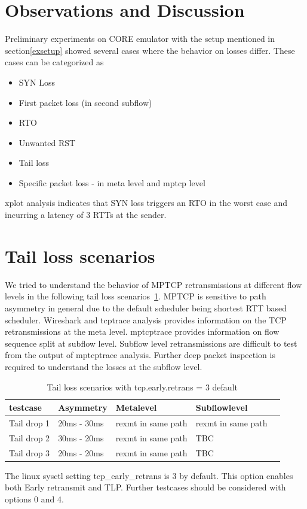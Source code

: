 \documentclass[12pt,draftcls,onecolumn]{IEEEtran}
\begin{document}
\section{Observations and Discussion}\label{disc}
Preliminary experiments on CORE emulator with the setup mentioned in section\ref{exsetup} showed several cases where the behavior on losses differ.
These cases can be categorized as 
\begin{itemize}
 \item SYN Loss
 \item First packet loss (in second subflow)
 \item RTO 
 \item Unwanted RST 
 \item Tail loss
 \item Specific packet loss - in meta level and mptcp level

\end{itemize}

xplot analysis indicates that SYN loss triggers an RTO in the worst case and incurring a latency of 3 RTTs at the sender.

\section{Tail loss scenarios}
We tried to understand the behavior of MPTCP retransmissions at different flow levels in the following tail loss scenarios~\ref{ret3}.
MPTCP is sensitive to path asymmetry in general due to the default scheduler being shortest RTT based scheduler. Wireshark and tcptrace
analysis provides information on the TCP retransmissions at the meta level. mptcptrace provides information on flow sequence split at 
subflow level. Subflow level retransmissions are difficult to test from the output of mptcptrace analysis. Further deep packet inspection
is required to understand the losses at the subflow level.

\begin{table}[]
\centering
\caption{Tail loss scenarios with tcp.early.retrans = 3 default}
\label{ret3}
\begin{tabular}{|l|l|l|l|l|}
\hline
 testcase   & Asymmetry   & Metalevel          & Subflowlevel       &  \\\hline
Tail drop 1 & 20ms - 30ms & rexmt in same path & rexmt in same path &  \\\hline
Tail drop 2 & 30ms - 20ms & rexmt in same path & TBC                &  \\\hline
Tail drop 3 & 20ms - 20ms & rexmt in same path & TBC                & \hline
\end{tabular}
\end{table}

The linux sysctl setting tcp\_early\_retrans is 3 by default. This option enables both Early retransmit and TLP. 
Further testcases should be considered with options 0 and 4. 




\end{document}
